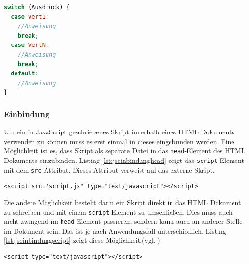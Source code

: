 \vspace{1em}
\begin{lstlisting}[language=JavaScript, caption=Syntax Switch-Anweisung, label=lst:jssyntaxswitch]
switch (Ausdruck) {
  case Wert1:
    //Anweisung
    break;
  case WertN:
    //Anweisung
    break;
  default:
    //Anweisung
}
\end{lstlisting}

\subsubsection{Einbindung} Um ein in JavaScript geschriebenes Skript innerhalb eines HTML Dokuments verwenden zu können muss es erst einmal in dieses eingebunden werden. Eine Möglichkeit ist es, dass Skript als separate Datei in das \texttt{head}-Element des HTML Dokuments einzubinden. Listing \ref{lst:jseinbindunghead} zeigt das \texttt{script}-Element mit dem \texttt{src}-Attribut. Dieses Attribut verweist auf das externe Skript.

\vspace{1em}
\begin{lstlisting}[language=HTML5, caption=JavaScript Einbindung als separate Datei im \texttt{head}-Element, label=lst:jseinbindunghead]
<script src="script.js" type="text/javascript"></script>
\end{lstlisting}

Die andere Möglichkeit besteht darin ein Skript direkt in das HTML Dokument zu schreiben und mit einem \texttt{script}-Element zu umschließen. Dies muss auch nicht zwingend im \texttt{head}-Element passieren, sondern kann auch an anderer Stelle im Dokument sein. Das ist je nach Anwendungsfall unterschiedlich. Listing \ref{lst:jseinbindungscript} zeigt diese Möglichkeit.(vgl. \cite[S.]{})

\vspace{1em}
\begin{lstlisting}[language=HTML5, caption=JavaScript Einbindung in \texttt{script}-Element, label=lst:jseinbindungscript]
<script type="text/javascript"></script>
\end{lstlisting}

